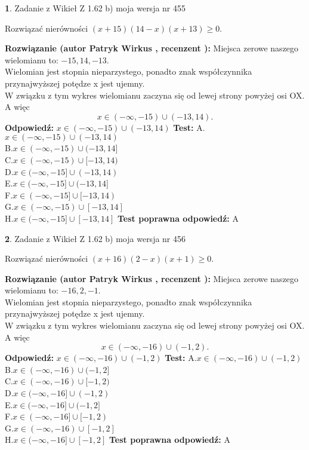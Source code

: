 \documentclass[12pt, a4paper]{article}
\theoremstyle{definition} %
\newtheorem{zad}{}
\newcommand{\zadStart}[1]{\begin{zad}#1\newline}
\newcommand{\zadStop}{\end{zad}}
\newcommand{\rozwStart}[2]{\noindent \textbf{Rozwiązanie (autor #1 , recenzent #2): }\newline}
\newcommand{\rozwStop}{\newline}
\newcommand{\odpStart}{\noindent \textbf{Odpowiedź:}\newline}
\newcommand{\odpStop}{\newline}
\newcommand{\testStart}{\noindent \textbf{Test:}\newline}
\newcommand{\testStop}{\newline}
\newcommand{\kluczStart}{\noindent \textbf{Test poprawna odpowiedź:}\newline}
\newcommand{\kluczStop}{\newline}
\begin{document}
\zadStart{Zadanie z Wikieł Z 1.62 b) moja wersja nr 455}

Rozwiązać nierówności $(x+15)(14-x)(x+13)\ge0$.
\zadStop
\rozwStart{Patryk Wirkus}{}
Miejsca zerowe naszego wielomianu to: $-15, 14, -13$.\\
Wielomian jest stopnia nieparzystego, ponadto znak współczynnika przy\linebreak najwyższej potędze x jest ujemny.\\ W związku z tym wykres wielomianu zaczyna się od lewej strony powyżej osi OX. A więc $$x \in (-\infty,-15) \cup (-13,14).$$
\rozwStop
\odpStart
$x \in (-\infty,-15) \cup (-13,14)$
\odpStop
\testStart
A.$x \in (-\infty,-15) \cup (-13,14)$\\
B.$x \in (-\infty,-15) \cup (-13,14]$\\
C.$x \in (-\infty,-15) \cup [-13,14)$\\
D.$x \in (-\infty,-15] \cup (-13,14)$\\
E.$x \in (-\infty,-15] \cup (-13,14]$\\
F.$x \in (-\infty,-15] \cup [-13,14)$\\
G.$x \in (-\infty,-15) \cup [-13,14]$\\
H.$x \in (-\infty,-15] \cup [-13,14]$
\testStop
\kluczStart
A
\kluczStop



\zadStart{Zadanie z Wikieł Z 1.62 b) moja wersja nr 456}

Rozwiązać nierówności $(x+16)(2-x)(x+1)\ge0$.
\zadStop
\rozwStart{Patryk Wirkus}{}
Miejsca zerowe naszego wielomianu to: $-16, 2, -1$.\\
Wielomian jest stopnia nieparzystego, ponadto znak współczynnika przy\linebreak najwyższej potędze x jest ujemny.\\ W związku z tym wykres wielomianu zaczyna się od lewej strony powyżej osi OX. A więc $$x \in (-\infty,-16) \cup (-1,2).$$
\rozwStop
\odpStart
$x \in (-\infty,-16) \cup (-1,2)$
\odpStop
\testStart
A.$x \in (-\infty,-16) \cup (-1,2)$\\
B.$x \in (-\infty,-16) \cup (-1,2]$\\
C.$x \in (-\infty,-16) \cup [-1,2)$\\
D.$x \in (-\infty,-16] \cup (-1,2)$\\
E.$x \in (-\infty,-16] \cup (-1,2]$\\
F.$x \in (-\infty,-16] \cup [-1,2)$\\
G.$x \in (-\infty,-16) \cup [-1,2]$\\
H.$x \in (-\infty,-16] \cup [-1,2]$
\testStop
\kluczStart
A
\kluczStop
\end{document}
